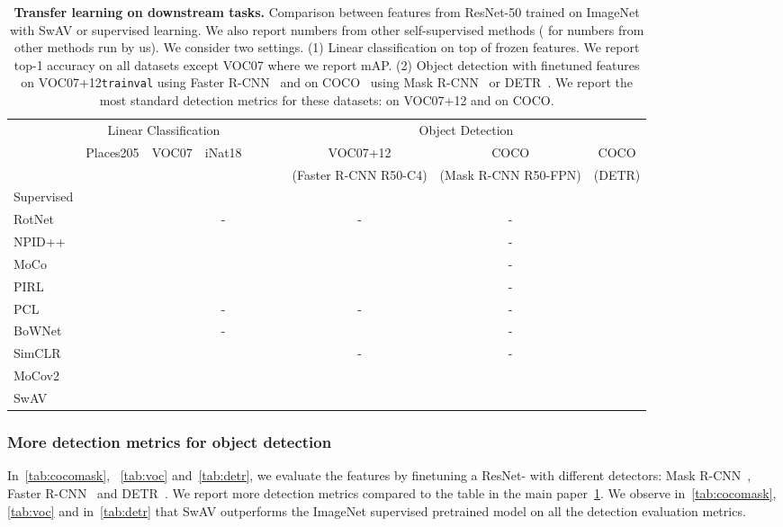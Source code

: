 \documentclass{article}
\def\OURS{SwAV\xspace}
\newcommand{\iNat}{iNat18\xspace}
\newcommand{\VOCseven}{VOC07\xspace}
\newcommand{\VOCseventwelve}{VOC07+12\xspace}
\newcommand{\Places}{Places205\xspace}
\begin{document}
\begin{table}[h]
\centering
    \caption{
\textbf{Transfer learning on downstream tasks.}
Comparison between features from ResNet-50 trained on ImageNet with \OURS or supervised learning.
We also report numbers from other self-supervised methods ( for numbers from other methods run by us).
We consider two settings.
(1) Linear classification on top of frozen features. We report top-1 accuracy on all datasets except \VOCseven where we report mAP.
	(2) Object detection with finetuned features on \VOCseventwelve \texttt{trainval} using Faster R-CNN~\cite{ren2015faster} and on COCO~\cite{lin2014microsoft} using Mask R-CNN~\cite{he2017mask} or DETR~\cite{carion2020end}.
We report the most standard detection metrics for these datasets:  on \VOCseventwelve and  on COCO.
    }
    \label{tab:frozen_and_detect_ap}
    \vspace{.4em}
  \setlength{\tabcolsep}{3.7pt}
    \begin{tabular}{ @{} l ccc c ccc @{} }
      \toprule
       & \multicolumn{3}{c}{Linear Classification} &~~~~& \multicolumn{3}{c}{Object Detection}\\
\cmidrule{2-4}\cmidrule{6-8}
	    &\Places & \VOCseven & \iNat && \VOCseventwelve & COCO & COCO \\
	    & &  &  && \scriptsize(Faster R-CNN R50-C4) & \scriptsize(Mask R-CNN R50-FPN) & \scriptsize(DETR) \\
      \midrule
	    Supervised &   &  &  &&  &  &  \\
      \midrule
	    RotNet~\cite{gidaris2020learning} &  &  & - && - & - \\
	    NPID++~\cite{misra2019self} &  &  &  &&  & - \\
MoCo~\cite{he2019momentum} &  &  &  &&  & - \\
	    PIRL~\cite{misra2019self} &  &  &  &&  & - \\
	    PCL~\cite{li2020prototypical} &  &  & - && - & - \\
	    BoWNet~\cite{gidaris2020learning} &  &  & - &&  & - \\
	    SimCLR~\cite{chen2020simple} &  &  &  && - & - \\
	    MoCov2~\cite{he2019momentum} &  &  &  &&  &  &  \\
      \midrule
	    \OURS  &  &  &  &&  &  &  \\
      \bottomrule
    \end{tabular}
\end{table}

\subsubsection{More detection metrics for object detection}
In~\cref{tab:cocomask}, ~\cref{tab:voc} and~\cref{tab:detr}, we evaluate the features by finetuning a ResNet- with different detectors: Mask R-CNN~\cite{he2017mask}, Faster R-CNN~\cite{ren2015faster} and DETR~\cite{carion2020end}.
We report more detection metrics compared to the table in the main paper~\cref{tab:frozen_and_detect_ap}.
We observe in~\cref{tab:cocomask}, \cref{tab:voc} and in~\cref{tab:detr} that \OURS outperforms the ImageNet supervised pretrained model on all the detection evaluation metrics.
\end{document}

